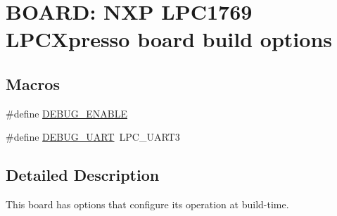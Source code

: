 \hypertarget{group___b_o_a_r_d___n_x_p___l_p_c_x_p_r_e_s_s_o__1769___o_p_t_i_o_n_s}{\section{B\+O\+A\+R\+D\+: N\+X\+P L\+P\+C1769 L\+P\+C\+Xpresso board build options}
\label{group___b_o_a_r_d___n_x_p___l_p_c_x_p_r_e_s_s_o__1769___o_p_t_i_o_n_s}
}
\subsection*{Macros}
\begin{DoxyCompactItemize}
\item 
\#define \hyperlink{group___b_o_a_r_d___n_x_p___l_p_c_x_p_r_e_s_s_o__1769___o_p_t_i_o_n_s_ga92f1452fef4b184124fa2334beb53a60}{D\+E\+B\+U\+G\+\_\+\+E\+N\+A\+B\+L\+E}
\item 
\#define \hyperlink{group___b_o_a_r_d___n_x_p___l_p_c_x_p_r_e_s_s_o__1769___o_p_t_i_o_n_s_gace21428290f0e412332701391f825a10}{D\+E\+B\+U\+G\+\_\+\+U\+A\+R\+T}~L\+P\+C\+\_\+\+U\+A\+R\+T3
\end{DoxyCompactItemize}


\subsection{Detailed Description}
This board has options that configure its operation at build-\/time.~\newline
 

